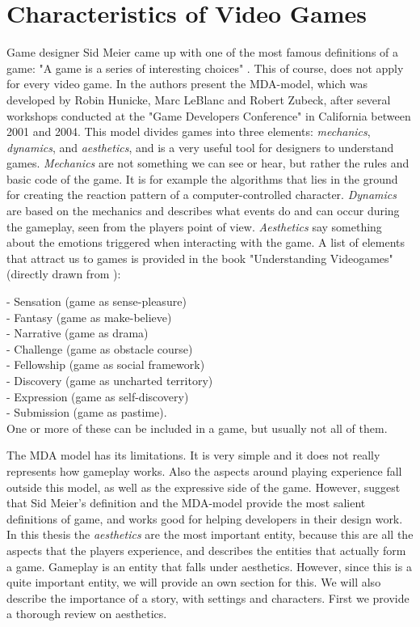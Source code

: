\chapter{Characteristics of Video Games}
Game designer Sid Meier came up with one of the most famous definitions of a game: "A game is a series of interesting choices" \cite{understandingvg}. This of course, does not apply for every video game. In \cite{understandingvg} the authors present the MDA-model, which was developed by Robin Hunicke, Marc LeBlanc and Robert Zubeck, after several workshops conducted at the "Game Developers Conference" in California between 2001 and 2004. This model divides games into three elements: \emph{mechanics}, \emph{dynamics}, and \emph{aesthetics}, and is a very useful tool for designers to understand games. \emph{Mechanics} are not something we can see or hear, but rather the rules and basic code of the game. It is for example the algorithms that lies in the ground for creating the reaction pattern of a computer-controlled character. \emph{Dynamics} are based on the mechanics and describes what events do and can occur during the gameplay, seen from the players point of view. \emph{Aesthetics} say something about the emotions triggered when interacting with the game. A list of elements  that attract us to games is provided in the book "Understanding Videogames" (directly drawn from \cite{understandingvg}): 

- Sensation (game as sense-pleasure)\\
- Fantasy (game as make-believe)\\
- Narrative (game as drama)\\
- Challenge (game as obstacle course)\\
- Fellowship (game as social framework)\\
- Discovery (game as uncharted territory)\\
- Expression (game as self-discovery)\\
- Submission (game as pastime).\\
One or more of these can be included in a game, but usually not all of them.

The MDA model has its limitations. It is very simple and it does not really represents how gameplay works. Also the aspects around playing experience fall outside this model, as well as the expressive side of the game. However, \cite{understandingvg} suggest that Sid Meier's definition and the MDA-model provide the most salient definitions of game, and works good for helping developers in their design work. In this thesis the \emph{aesthetics} are the most important entity, because this are all the aspects that the players experience, and describes the entities that actually form a game. Gameplay is an entity that falls under aesthetics. However, since this is a quite important entity, we will provide an own section for this. We will also describe the importance of a story, with settings and characters. First we provide a thorough review on aesthetics.  


